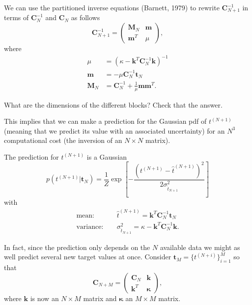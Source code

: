 \documentclass[%
oneside,                 %
final,                   %
10pt]{article}
\newenvironment{summary_mdfboxadmon}[1][]{
\begin{summary_mdfboxmdframed}[frametitle=#1]
}
{
\end{summary_mdfboxmdframed}
}
\newenvironment{question_mdfboxadmon}[1][]{
\begin{question_mdfboxmdframed}[frametitle=#1]
}
{
\end{question_mdfboxmdframed}
}
\begin{document}
We can use the partitioned inverse equations (Barnett, 1979) to rewrite $\boldsymbol{C}_{N+1}^{-1}$ in terms of $\boldsymbol{C}_{N}^{-1}$ and $\boldsymbol{C}_{N}$ as follows
\[
\boldsymbol{C}_{N+1}^{-1} =
\begin{pmatrix}
\boldsymbol{M}_N & \boldsymbol{m} \\
\boldsymbol{m}^T & \mu
\end{pmatrix},
\]
where
\begin{align*}
\mu &= \left( \kappa - \boldsymbol{k}^T \boldsymbol{C}_N^{-1} \boldsymbol{k} \right)^{-1} \\
\boldsymbol{m} &= -\mu \boldsymbol{C}_N^{-1} \boldsymbol{t}_N \\
\boldsymbol{M}_N &= \boldsymbol{C}_N^{-1} + \frac{1}{\mu} \boldsymbol{m} \boldsymbol{m}^T.
\end{align*}


\begin{question_mdfboxadmon}[Question]
What are the dimensions of the different blocks? Check that the answer.
\end{question_mdfboxadmon} %



This implies that we can make a prediction for the Gaussian pdf of $t^{(N+1)}$ (meaning that we predict its value with an associated uncertainty) for an $N^3$ computational cost (the inversion of an $N \times N$ matrix).


\begin{summary_mdfboxadmon}[Summary]
The prediction for $t^{(N+1)}$ is a Gaussian
\[
p \left( t^{(N+1)} | \boldsymbol{t}_N \right) = \frac{1}{Z} \exp
\left[
-\frac{\left( t^{(N+1)} - \hat{t}^{(N+1)} \right)^2}{2 \sigma_{\hat{t}_{N+1}}^2}
\right]
\]
with
\begin{align*}
\mathrm{mean:} & \quad \hat{t}^{(N+1)} = \boldsymbol{k}^T \boldsymbol{C}_N^{-1} \boldsymbol{t}_N \\
\mathrm{variance:} & \quad \sigma_{\hat{t}_{N+1}}^2 = \kappa - \boldsymbol{k}^T \boldsymbol{C}_N^{-1} \boldsymbol{k}.
\end{align*}
\end{summary_mdfboxadmon} %



In fact, since the prediction only depends on the $N$ available data we might as well predict several new target values at once. Consider $\boldsymbol{t}_M = \{ t^{(N+i)} \}_{i=1}^M$ so that
\[
\boldsymbol{C}_{N+M} =
\begin{pmatrix}
\boldsymbol{C}_N & \boldsymbol{k} \\
\boldsymbol{k}^T & \boldsymbol{\kappa}
\end{pmatrix},
\]
where $\boldsymbol{k}$ is now an $N \times M$ matrix and $\boldsymbol{\kappa}$ an $M \times M$ matrix.
\end{document}
